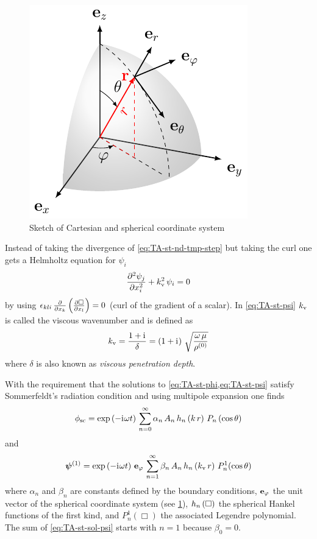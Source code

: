 \begin{figure}[tbp]
  \centering
  \includegraphics[]{Plots/cache/coordinate.pdf}
  \caption{Sketch of Cartesian and spherical coordinate system}
  \label{fig:TA-coordinate}
\end{figure}

Instead of taking the divergence of \cref{eq:TA-st-nd-tmp-step} but taking the 
curl one gets a Helmholtz equation for $\psi_{i}$
\begin{equation}
  \pdv[2]{\psi_{j}}{x_{i}} + k_{\mathrm{v}}^{2}\,\psi_{i} = 0
  \label{eq:TA-st-psi}
\end{equation}
by using $\epsilon_{kli}\,\pdv{x_{k}}\left( \pdv{\Box}{x_{l}} \right) = 0$ 
(curl of the gradient of a scalar). In \cref{eq:TA-st-psi} $k_{\mathrm{v}}$ is 
called the viscous wavenumber and is defined as
\begin{equation}
  k_{\mathrm{v}} = \frac{1 + \mathrm{i}\mkern1mu}{\delta} = \left( 1 + \mathrm{i}\mkern1mu \right)\, 
  \sqrt{\frac{\omega\,\mu}{\rho^{(0)}}}
  \label{eq:TA-st-visc-wavenumber}
\end{equation}
where $\delta$ is also known as \emph{viscous penetration depth}.

With the requirement that the solutions to \cref{eq:TA-st-phi,eq:TA-st-psi} 
satisfy Sommerfeldt's radiation condition and using multipole expansion one 
finds
\begin{equation}
  \phi_{\mathrm{sc}} = \exp\left( -\mathrm{i}\mkern1mu\omega t \right)\,
  \sum\limits^{\infty}_{n=0} 
  \alpha_{n}\,A_{n}\,h_{n}\left(k\,r\right)\,P_{n}\left(\cos\theta\right)
  \label{eq:TA-st-sol-phi}
\end{equation}
and
\begin{equation}
  \vb*{\psi}^{(1)} = \exp\left( -\mathrm{i}\mkern1mu\omega t \right)\,\vb{e}_{\varphi}\,
  \sum\limits^{\infty}_{n=1} 
  \beta_{n}\,A_{n}\,h_{n}\left(k_{\mathrm{v}}\,r\right)\,P^{1}_{n}(\cos\theta)
  \label{eq:TA-st-sol-psi}
\end{equation}
where $\alpha_{n}$ and $\beta_{n}$ are constants defined by the boundary 
conditions, $\vb{e}_{\varphi}$ the unit vector of the spherical coordinate 
system (see \cref{fig:TA-coordinate}), $h_{n}\left(\Box\right)$ the spherical Hankel 
functions of the first kind, and $P^{1}_{n}\left( \Box \right)$ the associated 
Legendre polynomial. The sum of \cref{eq:TA-st-sol-psi} starts with $n=1$ 
because $\beta_{0}=0$.

